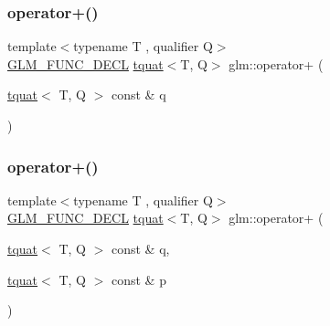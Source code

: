 \subsubsection{\texorpdfstring{operator+()}{operator+()}\hspace{0.1cm}{\footnotesize\ttfamily [1/2]}}
{\footnotesize\ttfamily template$<$typename T , qualifier Q$>$ \\
\hyperlink{setup_8hpp_ab2d052de21a70539923e9bcbf6e83a51}{G\+L\+M\+\_\+\+F\+U\+N\+C\+\_\+\+D\+E\+CL} \hyperlink{structglm_1_1tquat}{tquat}$<$T, Q$>$ glm\+::operator+ (\begin{DoxyParamCaption}\item[{\hyperlink{structglm_1_1tquat}{tquat}$<$ T, Q $>$ const \&}]{q }\end{DoxyParamCaption})}

\mbox{\label{group__gtc__quaternion_ga90911b1428a0a773fa9e0c0952ce25fd}} 
\subsubsection{\texorpdfstring{operator+()}{operator+()}\hspace{0.1cm}{\footnotesize\ttfamily [2/2]}}
{\footnotesize\ttfamily template$<$typename T , qualifier Q$>$ \\
\hyperlink{setup_8hpp_ab2d052de21a70539923e9bcbf6e83a51}{G\+L\+M\+\_\+\+F\+U\+N\+C\+\_\+\+D\+E\+CL} \hyperlink{structglm_1_1tquat}{tquat}$<$T, Q$>$ glm\+::operator+ (\begin{DoxyParamCaption}\item[{\hyperlink{structglm_1_1tquat}{tquat}$<$ T, Q $>$ const \&}]{q,  }\item[{\hyperlink{structglm_1_1tquat}{tquat}$<$ T, Q $>$ const \&}]{p }\end{DoxyParamCaption})}

\mbox{\label{group__gtc__quaternion_ga594339bbf8d9d11ec27ada0502d4eeaf}} 
